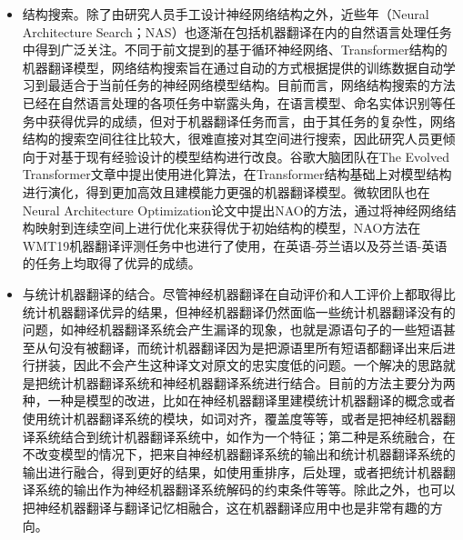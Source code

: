 \begin{itemize}
\vspace{0.5em}
\item 结构搜索。除了由研究人员手工设计神经网络结构之外，近些年{\small{}}（Neural Architecture Search；NAS）也逐渐在包括机器翻译在内的自然语言处理任务中得到广泛关注\cite{elsken2019neural}。不同于前文提到的基于循环神经网络、Transformer结构的机器翻译模型，网络结构搜索旨在通过自动的方式根据提供的训练数据自动学习到最适合于当前任务的神经网络模型结构。目前而言，网络结构搜索的方法已经在自然语言处理的各项任务中崭露头角，在语言模型、命名实体识别等任务中获得优异的成绩\cite{DBLP:conf/iclr/ZophL17,DBLP:conf/emnlp/JiangHXZZ19,liyinqiaoESS}，但对于机器翻译任务而言，由于其任务的复杂性，网络结构的搜索空间往往比较大，很难直接对其空间进行搜索，因此研究人员更倾向于对基于现有经验设计的模型结构进行改良。谷歌大脑团队在The Evolved Transformer文章中提出使用进化算法，在Transformer结构基础上对模型结构进行演化，得到更加高效且建模能力更强的机器翻译模型。微软团队也在Neural Architecture Optimization\cite{DBLP:conf/nips/LuoTQCL18}论文中提出NAO的方法，通过将神经网络结构映射到连续空间上进行优化来获得优于初始结构的模型，NAO方法在WMT19机器翻译评测任务中也进行了使用，在英语-芬兰语以及芬兰语-英语的任务上均取得了优异的成绩。
\vspace{0.5em}
\item 与统计机器翻译的结合。尽管神经机器翻译在自动评价和人工评价上都取得比统计机器翻译优异的结果，但神经机器翻译仍然面临一些统计机器翻译没有的问题\cite{DBLP:conf/aclnmt/KoehnK17}，如神经机器翻译系统会产生漏译的现象，也就是源语句子的一些短语甚至从句没有被翻译，而统计机器翻译因为是把源语里所有短语都翻译出来后进行拼装，因此不会产生这种译文对原文的忠实度低的问题。一个解决的思路就是把统计机器翻译系统和神经机器翻译系统进行结合。目前的方法主要分为两种，一种是模型的改进，比如在神经机器翻译里建模统计机器翻译的概念或者使用统计机器翻译系统的模块，如词对齐，覆盖度等等\cite{DBLP:conf/aaai/HeHWW16}，或者是把神经机器翻译系统结合到统计机器翻译系统中，如作为一个特征\cite{DBLP:conf/aclwat/NeubigMN15}；第二种是系统融合，在不改变模型的情况下，把来自神经机器翻译系统的输出和统计机器翻译系统的输出进行融合，得到更好的结果，如使用重排序\cite{DBLP:conf/ijcnlp/KhayrallahKDPK17,DBLP:conf/aclwat/NeubigMN15}，后处理\cite{niehues-etal-2016-pre}，或者把统计机器翻译系统的输出作为神经机器翻译系统解码的约束条件等等\cite{DBLP:conf/eacl/GispertBHS17}。除此之外，也可以把神经机器翻译与翻译记忆相融合\cite{DBLP:conf/aaai/XiaHLS19,DBLP:conf/nlpcc/HeHLL19}，这在机器翻译应用中也是非常有趣的方向。
\end{itemize}












